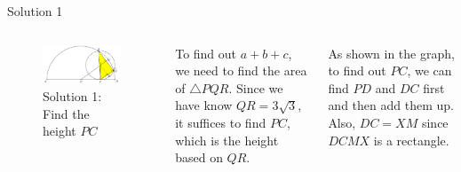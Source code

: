 \documentclass[professionalfont, 12pt, handout, t]{beamer} %
\theoremstyle{plain}
\theoremstyle{definition}
\begin{document}
\begin{frame}{Solution 1}
    \begin{columns}    
        \begin{figure}[h]
            \centering
            \includegraphics[scale=0.3]{Geometry Solution 1.PNG}
            \captionsetup{labelformat=empty}
            \caption{Solution 1: Find the height $PC$}
        \end{figure}

        To find out $a+b+c$, we need to find the area of $\triangle PQR$.
        Since we have know $QR = 3\sqrt{3}$, it suffices to find $PC$, which is the height based on $QR$.
        \pause

        As shown in the graph, to find out $PC$, we can find $PD$ and $DC$ first and then add them up.
        Also, $DC = XM$ since $DCMX$ is a rectangle.
    \end{columns}
\end{frame}
\end{document}
